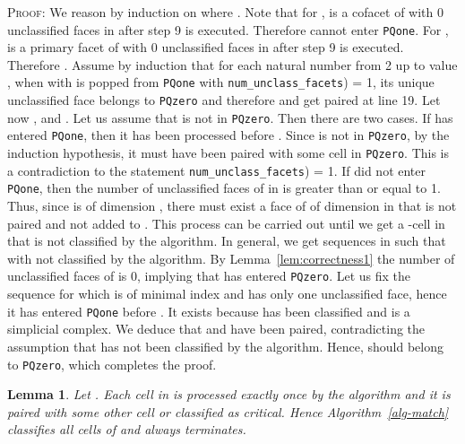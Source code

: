 \documentclass[12pt]{article}
\newtheorem{lem}[thm]{Lemma}
\newenvironment{proof}{\noindent\textsc{Proof: }}{\hfill\par\medskip\par}
\begin{document}
\begin{proof}
We reason by induction on  where . Note that for ,  is a cofacet of  with 0 unclassified faces in  after step 9 is executed. Therefore  cannot enter \texttt{PQone}. For ,  is a primary facet of  with 0 unclassified faces in  after step 9 is executed. Therefore . Assume by induction that for each natural number  from 2 up to value , when  with  is popped from \texttt{PQone} with \texttt{{num}\_{unclass}\_{facets}}) = 1, its unique unclassified face  belongs to \texttt{PQzero} and therefore  and  get paired at line 19. Let now , and  . Let us assume that  is not in \texttt{PQzero}. Then there are two cases. If  has entered \texttt{PQone}, then it has been processed before . Since  is not in \texttt{PQzero}, by the induction hypothesis, it must have been paired with some cell in \texttt{PQzero}. This is a contradiction to the statement \texttt{{num}\_{unclass}\_{facets}}) = 1. If  did not enter \texttt{PQone}, then the number of unclassified faces of  in  is greater than or equal to 1. Thus, since  is of dimension , there must exist a face  of  of dimension  in  that is not paired and not added to . This process can be carried out until we get a -cell  in  that is not classified by the algorithm. In general, we get sequences in  such that
 with  not classified by the algorithm. By Lemma~\ref{lem:correctness1} the number of unclassified faces of  is 0, implying that  has entered \texttt{PQzero}. Let us fix the sequence for which  is of minimal index and has only one unclassified face, hence it has entered \texttt{PQone} before . It exists because  has been classified and  is a simplicial complex.  We deduce that   and   have been paired, contradicting the assumption that  has not  been classified by the algorithm. Hence,  should belong to \texttt{PQzero}, which completes the proof.
\end{proof}

\begin{lem}\label{lem:correctness3}
Let . Each cell in  is processed exactly once by the algorithm
and it is paired with some other cell or classified as critical. Hence Algorithm~\ref{alg-match} classifies all cells of  and always terminates.
\end{lem}
\end{document}
